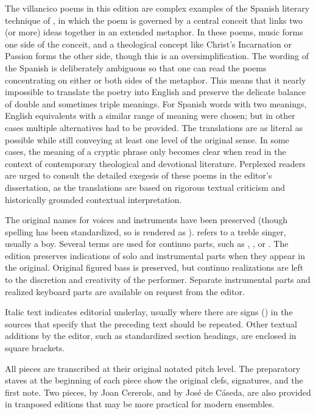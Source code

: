 The villancico poems in this edition are complex examples of the Spanish
literary technique of , in which the poem is governed by a
central conceit that links two (or more) ideas together in an extended
metaphor.%
    \Autocite{Gaylord:Poetry}
In these poems, music forms one side of the conceit, and a theological concept
like Christ's Incarnation or Passion forms the other side, though this is an
oversimplification.
The wording of the Spanish is deliberately ambiguous so that one can read the
poems concentrating on either or both sides of the metaphor.
This means that it nearly impossible to translate the poetry into English and
preserve the delicate balance of double and sometimes triple meanings.
For Spanish words with two meanings, English equivalents with a similar range of
meaning were chosen; but in other cases multiple alternatives had to be
provided.
The translations are as literal as possible while still conveying at least one
level of the original sense.
In some cases, the meaning of a cryptic phrase only becomes clear when read in
the context of contemporary theological and devotional literature.
Perplexed readers are urged to consult the detailed exegesis of these poems in
the editor's dissertation, as the translations are based on rigorous textual
criticism and historically grounded contextual interpretation.

The original names for voices and instruments have been preserved (though
spelling has been standardized, so  is rendered as
).
 refers to a treble singer, usually a boy.
Several terms are used for continuo parts, such as ,
, or .
The edition preserves indications of solo and instrumental parts when they
appear in the original.
Original figured bass is preserved, but continuo realizations are left to the
discretion and creativity of the performer.
Separate instrumental parts and realized keyboard parts are available on request
from the editor.

Italic text indicates editorial underlay, usually where there are signs
(\MSrepeat{}) in the sources that specify that the preceding text should
be repeated.
Other textual additions by the editor, such as standardized section headings, 
are enclosed in square brackets.

All pieces are transcribed at their original notated pitch level.
The preparatory staves at the beginning of each piece show the original clefs, 
signatures, and the first note.
Two pieces,  by Joan Cererols, and  by José de Cáseda, are also provided in tranposed editions that
may be more practical for modern ensembles.

